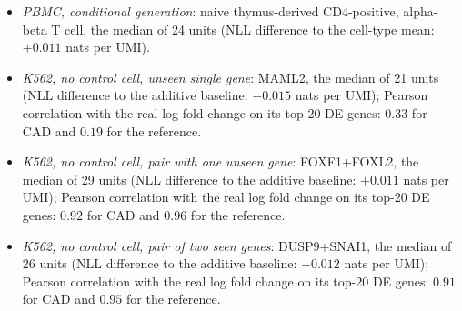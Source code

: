 \begin{itemize}
\item[(a)] \emph{PBMC, conditional generation}: naive thymus-derived CD4-positive, alpha-beta T cell, the median of 24 units (NLL difference to the cell-type mean: $+0.011$ nats per UMI).
\item[(b)] \emph{K562, no control cell, unseen single gene}: MAML2, the median of 21 units (NLL difference to the additive baseline: $-0.015$ nats per UMI); Pearson correlation with the real log fold change on its top-20 DE genes: $0.33$ for CAD and $0.19$ for the reference.
\item[(c)] \emph{K562, no control cell, pair with one unseen gene}: FOXF1+FOXL2, the median of 29 units (NLL difference to the additive baseline: $+0.011$ nats per UMI); Pearson correlation with the real log fold change on its top-20 DE genes: $0.92$ for CAD and $0.96$ for the reference.
\item[(d)] \emph{K562, no control cell, pair of two seen genes}: DUSP9+SNAI1, the median of 26 units (NLL difference to the additive baseline: $-0.012$ nats per UMI); Pearson correlation with the real log fold change on its top-20 DE genes: $0.91$ for CAD and $0.95$ for the reference.
\end{itemize}
